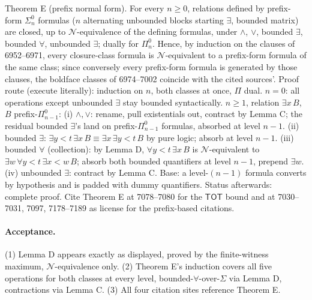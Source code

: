 Theorem E (prefix normal form).  For every \(n\geq0\), relations defined by prefix-form \(\Sigma^0_n\) formulas (\(n\) alternating unbounded blocks starting \(\exists\), bounded matrix) are closed, up to \(\mathcal N\)-equivalence of the defining formulas, under \(\land\), \(\lor\), bounded \(\exists\), bounded \(\forall\), unbounded \(\exists\); dually for \(\Pi^0_n\).  Hence, by induction on the clauses of 6952--6971, every closure-class formula is \(\mathcal N\)-equivalent to a prefix-form formula of the same class; since conversely every prefix-form formula is generated by those clauses, the boldface classes of 6974--7002 coincide with the cited sources'.  Proof route (execute literally): induction on \(n\), both classes at once, \(\Pi\) dual.  \(n=0\): all operations except unbounded \(\exists\) stay bounded syntactically.  \(n\geq1\), relation \(\exists x\,B\), \(B\) prefix-\(\Pi^0_{n-1}\): (i) \(\land,\lor\): rename, pull existentials out, contract by Lemma C; the residual bounded \(\exists\)'s land on prefix-\(\Pi^0_{n-1}\) formulas, absorbed at level \(n-1\).  (ii) bounded \(\exists\): \(\exists y\!<\!t\,\exists x\,B\equiv\exists x\,\exists y\!<\!t\,B\) by pure logic; absorb at level \(n-1\).  (iii) bounded \(\forall\) (collection): by Lemma D, \(\forall y\!<\!t\,\exists x\,B\) is \(\mathcal N\)-equivalent to \(\exists w\,\forall y\!<\!t\,\exists x\!<\!w\,B\); absorb both bounded quantifiers at level \(n-1\), prepend \(\exists w\).  (iv) unbounded \(\exists\): contract by Lemma C.  Base: a level-\((n-1)\) formula converts by hypothesis and is padded with dummy quantifiers.  Status afterwards: complete proof.  Cite Theorem E at 7078--7080 for the \(\mathsf{TOT}\) bound and at 7030--7031, 7097, 7178--7189 as license for the prefix-based citations.

\paragraph{Acceptance.} (1) Lemma D appears exactly as displayed, proved by the finite-witness maximum, \(\mathcal N\)-equivalence only.  (2) Theorem E's induction covers all five operations for both classes at every level, bounded-\(\forall\)-over-\(\Sigma\) via Lemma D, contractions via Lemma C.  (3) All four citation sites reference Theorem E.
